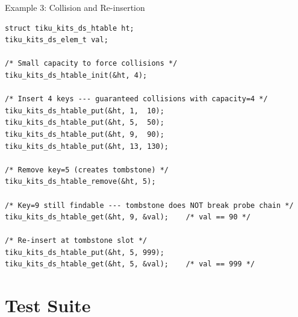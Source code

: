 \documentclass[aspectratio=169, 10pt]{beamer}
\begin{document}
\begin{frame}[fragile]{Example 3: Collision and Re-insertion}
\begin{lstlisting}[style=cstyle,
  title={Demonstrating collision handling and tombstone reuse}]
struct tiku_kits_ds_htable ht;
tiku_kits_ds_elem_t val;

/* Small capacity to force collisions */
tiku_kits_ds_htable_init(&ht, 4);

/* Insert 4 keys --- guaranteed collisions with capacity=4 */
tiku_kits_ds_htable_put(&ht, 1,  10);
tiku_kits_ds_htable_put(&ht, 5,  50);
tiku_kits_ds_htable_put(&ht, 9,  90);
tiku_kits_ds_htable_put(&ht, 13, 130);

/* Remove key=5 (creates tombstone) */
tiku_kits_ds_htable_remove(&ht, 5);

/* Key=9 still findable --- tombstone does NOT break probe chain */
tiku_kits_ds_htable_get(&ht, 9, &val);    /* val == 90 */

/* Re-insert at tombstone slot */
tiku_kits_ds_htable_put(&ht, 5, 999);
tiku_kits_ds_htable_get(&ht, 5, &val);    /* val == 999 */
\end{lstlisting}
\end{frame}

\section{Test Suite}
\end{document}
